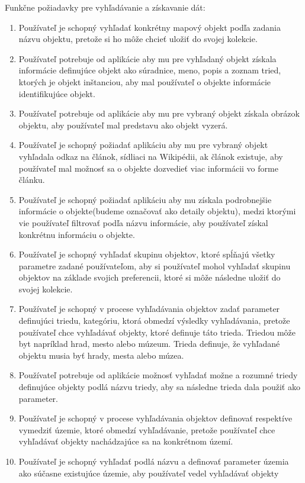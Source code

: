 Funkčne požiadavky pre vyhľadávanie a získavanie dát:
\begin{enumerate}
      \item Používateľ je schopný vyhľadať konkrétny mapový objekt podľa zadania názvu objektu, pretože si ho môže chcieť uložiť do svojej kolekcie.
      \item Používateľ potrebuje od aplikácie aby mu pre vyhľadaný objekt získala informácie definujúce objekt ako súradnice, meno, popis a zoznam tried, ktorých je objekt
            inštanciou, aby mal používateľ o objekte informácie identifikujúce objekt.
      \item Používateľ potrebuje od aplikácie aby mu pre vybraný objekt získala obrázok objektu, aby používateľ mal predstavu ako objekt vyzerá.
      \item Používateľ je schopný požiadať aplikáciu aby mu pre vybraný objekt vyhľadala odkaz na článok, sídliaci na Wikipédii, ak článok existuje, aby používateľ mal možnosť
            sa o objekte dozvedieť viac informácii vo forme článku.
      \item Používateľ je schopný požiadať aplikáciu aby mu získala podrobnejšie informácie o objekte(budeme označovať ako detaily objektu), medzi ktorými vie používateľ
            filtrovať podľa názvu informácie, aby používateľ získal konkrétnu informáciu o objekte.
      \item Používateľ je schopný vyhľadať skupinu objektov, ktoré spĺňajú všetky parametre zadané používateľom, aby si používateľ mohol vyhľadať  skupinu objektov na základe
            svojich preferencii, ktoré si môže následne uložiť do svojej kolekcie.
      \item Používateľ je schopný v procese vyhľadávania objektov zadať parameter definujúci triedu, kategóriu, ktorá obmedzí výsledky vyhľadávania, pretože používateľ chce vyhľadávať
            objekty, ktoré definuje táto trieda. Triedou môže byt napríklad hrad, mesto alebo múzeum. Trieda definuje, že vyhľadané objektu musia byť hrady, mesta alebo múzea.
      \item Používateľ potrebuje od aplikácie možnosť vyhľadať možne a rozumné triedy definujúce objekty podlá názvu triedy, aby sa následne trieda dala použiť ako parameter.
      \item Používateľ je schopný v procese vyhľadávania objektov definovať respektíve vymedziť územie, ktoré obmedzí vyhľadávanie, pretože používateľ chce vyhľadávať objekty nachádzajúce sa
            na konkrétnom území.
      \item Používateľ je schopný vyhľadať podlá názvu a definovať parameter územia ako súčasne existujúce územie, aby používateľ vedel vyhľadávať objekty

\end{enumerate}
